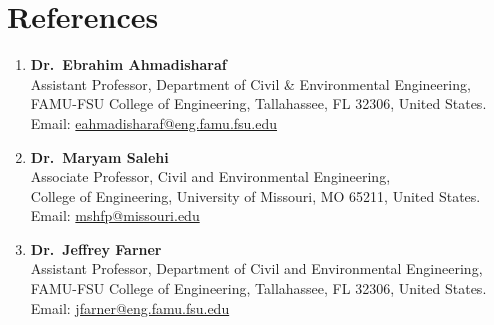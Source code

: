 \documentclass[a4paper,11pt]{article}
\begin{document}
\section{\textbf{References}}
\vspace{1mm}
\small{
\begin{enumerate}[leftmargin=*,labelsep=2mm]

\item \textbf{Dr.\ Ebrahim Ahmadisharaf}\\
   Assistant Professor, Department of Civil \& Environmental Engineering,\\
   FAMU-FSU College of Engineering, Tallahassee, FL 32306, United States.\\
   Email: \href{mailto:eahmadisharaf@eng.famu.fsu.edu}{eahmadisharaf@eng.famu.fsu.edu}

\item \textbf{Dr.\ Maryam Salehi}\\
   Associate Professor, Civil and Environmental Engineering,\\
   College of Engineering, University of Missouri, MO 65211, United States.\\
   Email: \href{mailto:mshfp@missouri.edu}{mshfp@missouri.edu}

\item \textbf{Dr.\ Jeffrey Farner}\\
   Assistant Professor, Department of Civil and Environmental Engineering,\\
   FAMU-FSU College of Engineering, Tallahassee, FL 32306, United States.\\
   Email: \href{mailto:jfarner@eng.famu.fsu.edu}{jfarner@eng.famu.fsu.edu}

\end{enumerate}
}
\end{document}

